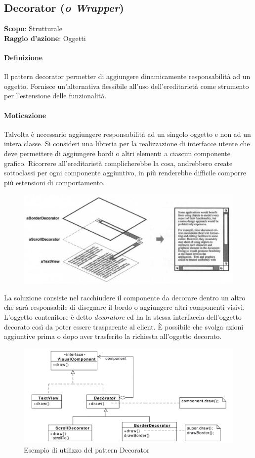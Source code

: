 \subsection{Decorator (\textit{o Wrapper})}
\label{decorator}

\textbf{Scopo}: Strutturale \\
\textbf{Raggio d'azione}: Oggetti

\paragraph{Definizione} Il pattern decorator permetter di aggiungere dinamicamente responsabilità ad un oggetto. Fornisce un'alternativa flessibile all'uso dell'ereditarietà come strumento per l'estensione delle funzionalità.

\paragraph{Moticazione} Talvolta è necessario aggiungere responsabilità ad un singolo oggetto e non ad un intera classe. Si consideri una libreria per la realizzazione di interfacce utente che deve permettere di aggiungere bordi o altri elementi a ciascun componente grafico. Ricorrere all'ereditarietà complicherebbe la cosa, andrebbero create sottoclassi per ogni componente aggiuntivo, in più renderebbe difficile comporre più estensioni di comportamento.

\begin{figure}[H]
    \centering
    \includegraphics[width=0.5\linewidth]{assets/pattern/decorator/decorator-esempio-grafico.png}
\end{figure}

La soluzione consiste nel racchiudere il componente da decorare dentro un altro che sarà responsabile di disegnare il bordo o aggiungere altri componenti visivi. L'oggetto contenitore è detto \textit{decoratore} ed ha la stessa interfaccia dell'oggetto decorato così da poter essere trasparente al client. È possibile che svolga azioni aggiuntive prima o dopo aver trasferito la richiesta all'oggetto decorato.

\begin{figure}[H]
    \centering
    \includegraphics[width=0.75\linewidth]{assets/pattern/decorator/decorator-esempio.png}
    \caption{Esempio di utilizzo del pattern Decorator}
\end{figure}

